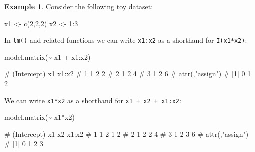 \documentclass[
  a4paper,
]{article}
\newenvironment{Shaded}{\begin{snugshade}}{\end{snugshade}}
\newcommand{\DecValTok}[1]{\textcolor[rgb]{0.00,0.00,0.81}{#1}}
\newcommand{\FunctionTok}[1]{\textcolor[rgb]{0.00,0.00,0.00}{#1}}
\newcommand{\NormalTok}[1]{#1}
\newcommand{\OtherTok}[1]{\textcolor[rgb]{0.56,0.35,0.01}{#1}}
\newcommand{\SpecialCharTok}[1]{\textcolor[rgb]{0.00,0.00,0.00}{#1}}
\theoremstyle{definition}
\theoremstyle{definition}
\newtheorem{example}{Example}[section]
\theoremstyle{definition}
\theoremstyle{definition}
\theoremstyle{remark}
\begin{document}
\begin{example}

Consider the following toy dataset:

\begin{Shaded}
\begin{Highlighting}[]
\NormalTok{x1 }\OtherTok{\textless{}{-}} \FunctionTok{c}\NormalTok{(}\DecValTok{2}\NormalTok{,}\DecValTok{2}\NormalTok{,}\DecValTok{2}\NormalTok{)}
\NormalTok{x2 }\OtherTok{\textless{}{-}} \DecValTok{1}\SpecialCharTok{:}\DecValTok{3}
\end{Highlighting}
\end{Shaded}

In \texttt{lm()} and related functions we can write \texttt{x1:x2} as a shorthand
for \texttt{I(x1*x2)}:

\begin{Shaded}
\begin{Highlighting}[]
\FunctionTok{model.matrix}\NormalTok{(}\SpecialCharTok{\textasciitilde{}}\NormalTok{ x1 }\SpecialCharTok{+}\NormalTok{ x1}\SpecialCharTok{:}\NormalTok{x2)}
\end{Highlighting}
\end{Shaded}

\begin{Shaded}
\begin{Highlighting}[]
\NormalTok{\#   (Intercept) x1 x1:x2}
\NormalTok{\# 1           1  2     2}
\NormalTok{\# 2           1  2     4}
\NormalTok{\# 3           1  2     6}
\NormalTok{\# attr(,"assign")}
\NormalTok{\# [1] 0 1 2}
\end{Highlighting}
\end{Shaded}

We can write \texttt{x1*x2} as a shorthand for \texttt{x1\ +\ x2\ +\ x1:x2}:

\begin{Shaded}
\begin{Highlighting}[]
\FunctionTok{model.matrix}\NormalTok{(}\SpecialCharTok{\textasciitilde{}}\NormalTok{ x1}\SpecialCharTok{*}\NormalTok{x2)}
\end{Highlighting}
\end{Shaded}

\begin{Shaded}
\begin{Highlighting}[]
\NormalTok{\#   (Intercept) x1 x2 x1:x2}
\NormalTok{\# 1           1  2  1     2}
\NormalTok{\# 2           1  2  2     4}
\NormalTok{\# 3           1  2  3     6}
\NormalTok{\# attr(,"assign")}
\NormalTok{\# [1] 0 1 2 3}
\end{Highlighting}
\end{Shaded}

\end{example}
\end{document}
